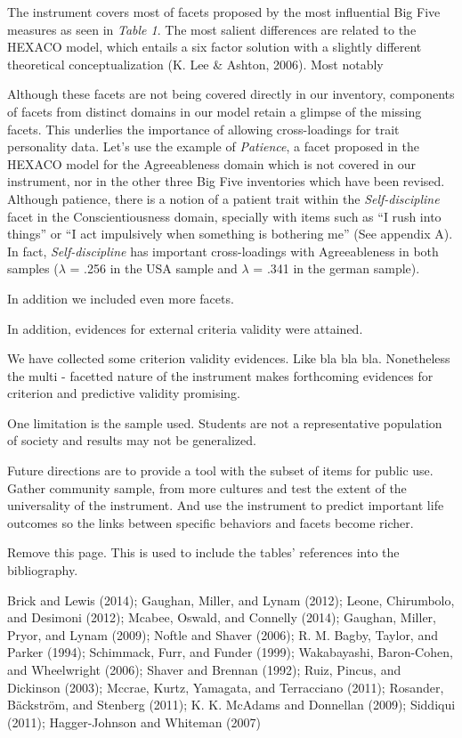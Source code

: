 \documentclass[,man,floatsintext]{apa6}
\begin{document}
The instrument covers most of facets proposed by the most influential
Big Five measures as seen in \emph{Table 1}. The most salient
differences are related to the HEXACO model, which entails a six factor
solution with a slightly different theoretical conceptualization (K. Lee
\& Ashton, 2006). Most notably

Although these facets are not being covered directly in our inventory,
components of facets from distinct domains in our model retain a glimpse
of the missing facets. This underlies the importance of allowing
cross-loadings for trait personality data. Let's use the example of
\emph{Patience}, a facet proposed in the HEXACO model for the
Agreeableness domain which is not covered in our instrument, nor in the
other three Big Five inventories which have been revised. Although
patience, there is a notion of a patient trait within the
\emph{Self-discipline} facet in the Conscientiousness domain, specially
with items such as \enquote{I rush into things} or \enquote{I act
impulsively when something is bothering me} (See appendix A). In fact,
\emph{Self-discipline} has important cross-loadings with Agreeableness
in both samples (\(\lambda\) = .256 in the USA sample and \(\lambda\) =
.341 in the german sample).

In addition we included even more facets.

In addition, evidences for external criteria validity were attained.

We have collected some criterion validity evidences. Like bla bla bla.
Nonetheless the multi - facetted nature of the instrument makes
forthcoming evidences for criterion and predictive validity promising.

One limitation is the sample used. Students are not a representative
population of society and results may not be generalized.

Future directions are to provide a tool with the subset of items for
public use. Gather community sample, from more cultures and test the
extent of the universality of the instrument. And use the instrument to
predict important life outcomes so the links between specific behaviors
and facets become richer.

\newpage

Remove this page. This is used to include the tables' references into
the bibliography.

Brick and Lewis (2014); Gaughan, Miller, and Lynam (2012); Leone,
Chirumbolo, and Desimoni (2012); Mcabee, Oswald, and Connelly (2014);
Gaughan, Miller, Pryor, and Lynam (2009); Noftle and Shaver (2006); R.
M. Bagby, Taylor, and Parker (1994); Schimmack, Furr, and Funder (1999);
Wakabayashi, Baron-Cohen, and Wheelwright (2006); Shaver and Brennan
(1992); Ruiz, Pincus, and Dickinson (2003); Mccrae, Kurtz, Yamagata, and
Terracciano (2011); Rosander, Bäckström, and Stenberg (2011); K. K.
McAdams and Donnellan (2009); Siddiqui (2011); Hagger-Johnson and
Whiteman (2007)
\end{document}
